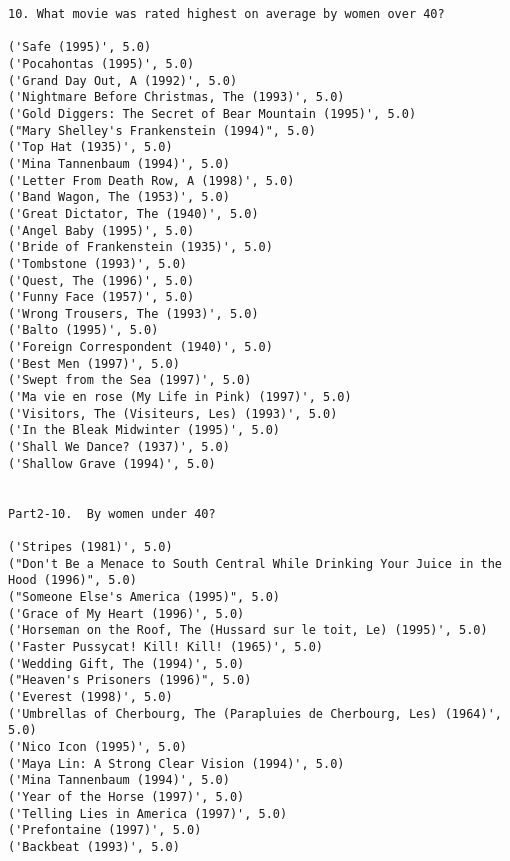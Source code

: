 \documentclass[letterpaper,11pt]{article}
\begin{document}
\begin{lstlisting}
10. What movie was rated highest on average by women over 40? 

('Safe (1995)', 5.0)
('Pocahontas (1995)', 5.0)
('Grand Day Out, A (1992)', 5.0)
('Nightmare Before Christmas, The (1993)', 5.0)
('Gold Diggers: The Secret of Bear Mountain (1995)', 5.0)
("Mary Shelley's Frankenstein (1994)", 5.0)
('Top Hat (1935)', 5.0)
('Mina Tannenbaum (1994)', 5.0)
('Letter From Death Row, A (1998)', 5.0)
('Band Wagon, The (1953)', 5.0)
('Great Dictator, The (1940)', 5.0)
('Angel Baby (1995)', 5.0)
('Bride of Frankenstein (1935)', 5.0)
('Tombstone (1993)', 5.0)
('Quest, The (1996)', 5.0)
('Funny Face (1957)', 5.0)
('Wrong Trousers, The (1993)', 5.0)
('Balto (1995)', 5.0)
('Foreign Correspondent (1940)', 5.0)
('Best Men (1997)', 5.0)
('Swept from the Sea (1997)', 5.0)
('Ma vie en rose (My Life in Pink) (1997)', 5.0)
('Visitors, The (Visiteurs, Les) (1993)', 5.0)
('In the Bleak Midwinter (1995)', 5.0)
('Shall We Dance? (1937)', 5.0)
('Shallow Grave (1994)', 5.0)


Part2-10.  By women under 40?

('Stripes (1981)', 5.0)
("Don't Be a Menace to South Central While Drinking Your Juice in the Hood (1996)", 5.0)
("Someone Else's America (1995)", 5.0)
('Grace of My Heart (1996)', 5.0)
('Horseman on the Roof, The (Hussard sur le toit, Le) (1995)', 5.0)
('Faster Pussycat! Kill! Kill! (1965)', 5.0)
('Wedding Gift, The (1994)', 5.0)
("Heaven's Prisoners (1996)", 5.0)
('Everest (1998)', 5.0)
('Umbrellas of Cherbourg, The (Parapluies de Cherbourg, Les) (1964)', 5.0)
('Nico Icon (1995)', 5.0)
('Maya Lin: A Strong Clear Vision (1994)', 5.0)
('Mina Tannenbaum (1994)', 5.0)
('Year of the Horse (1997)', 5.0)
('Telling Lies in America (1997)', 5.0)
('Prefontaine (1997)', 5.0)
('Backbeat (1993)', 5.0)
\end{lstlisting}


\newpage
\end{document}
